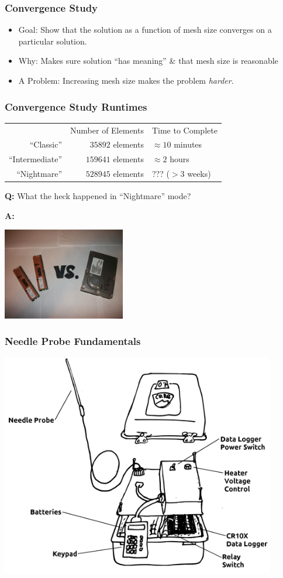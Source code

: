 \documentclass{beamer}
\begin{document}
\begin{frame}
\frametitle{Convergence Study}
\begin{itemize}
\item Goal: Show that the solution as a function of mesh size converges on a particular solution.
\item Why: Makes sure solution ``has meaning'' \& that mesh size is reasonable
\item A Problem: Increasing mesh size makes the problem \emph{harder}.
\end{itemize}
\end{frame}


\begin{frame}
\frametitle{Convergence Study Runtimes}
    \begin{table}
    \begin{tabular}{r | r | l}
     & Number of Elements & Time to Complete\\
    ``Classic'' & \(35892\) elements & \(\approx 10\) minutes\\
    ``Intermediate'' & \(159641\) elements & \(\approx 2\) hours\\
    ``Nightmare'' & \(528945\) elements & ??? (\(>3\) weeks)\\
    \end{tabular}
    \end{table}
\textbf{Q:} What the heck happened in ``Nightmare'' mode?

\textbf{A:}\\
\begin{center}
\includegraphics[width=0.4\textwidth]{fig/thedisk.jpg}
\end{center}
\end{frame}


\begin{frame}
\frametitle{Needle Probe Fundamentals}
\includegraphics[width=0.9\textwidth]{fig/apparatus.png}
\end{frame}
\end{document}
